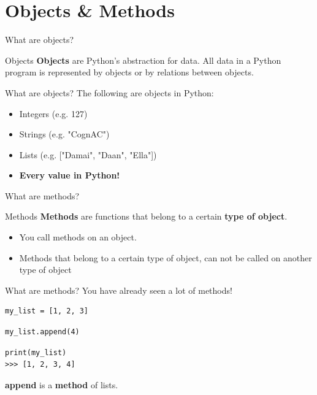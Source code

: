 \section{Objects \& Methods}
\begin{frame}{What are objects?}
    \pause
    \begin{block}{Objects}
        \textbf{Objects} are Python's abstraction for data. All data in a Python program is represented by objects or by relations between objects.
    \end{block}
\end{frame}

\begin{frame}{What are objects?}
\pause
    The following are objects in Python:
    \begin{itemize}
        \pause
        \item Integers (e.g. 127) \pause
        \item Strings (e.g. "CognAC")\pause
        \item Lists (e.g. ["Damai", "Daan", "Ella"])\pause
        \item \textbf{Every value in Python!}
    \end{itemize}
\end{frame}

\begin{frame}{What are methods?}
    \pause
    \begin{block}{Methods}
        \textbf{Methods} are functions that belong to a certain \textbf{type of object}.
    \end{block}
    \begin{itemize}
        \pause
        \item You call methods on an object.
        \pause
        \item Methods that belong to a certain type of object, can not be called on another type of object
    \end{itemize}
\end{frame}

\begin{frame}[fragile]{What are methods?}
You have already seen a lot of methods!
\pause
\begin{verbatim}
my_list = [1, 2, 3]
\end{verbatim} 
\pause
\begin{verbatim}
my_list.append(4)
\end{verbatim}
\pause
\begin{verbatim}
print(my_list)
>>> [1, 2, 3, 4]
\end{verbatim} 
\pause
\textbf{append} is a \textbf{method} of {lists}.
\end{frame}

